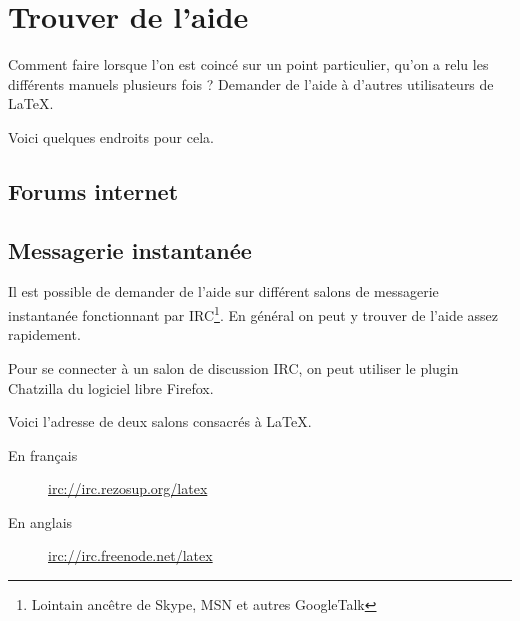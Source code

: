 \chapter{Trouver de l'aide}

\begin{prealable}
Comment faire lorsque l'on est coincé sur un point particulier, qu'on a relu les différents manuels plusieurs fois ? Demander de l'aide à d'autres utilisateurs de \LaTeX{}.

Voici quelques endroits pour cela.
\end{prealable}

\section{Forums internet}

\section{Messagerie instantanée}

Il est possible de demander de l'aide sur différent salons de messagerie instantanée fonctionnant par IRC\footnote{Lointain ancêtre de Skype, MSN et autres GoogleTalk}. En général on peut y trouver de l'aide assez rapidement.

Pour se connecter à un salon de discussion IRC, on peut utiliser le plugin Chatzilla du logiciel libre Firefox.

Voici l'adresse de deux salons consacrés à \LaTeX.

\begin{description}
\item[En français]\url{irc://irc.rezosup.org/latex}
\item[En anglais]\url{irc://irc.freenode.net/latex}
\end{description}
